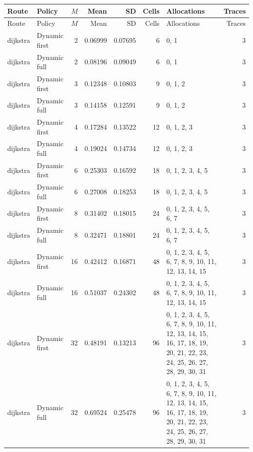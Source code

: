 \documentclass[10pt,a4paper]{article}
\begin{document}
\tiny\setlength{\tabcolsep}{2pt}\begin{longtable}{@{}p{23mm}p{29mm}rrrrp{36mm}r@{}}
\toprule Route & Policy & $M$ & Mean & SD & Cells & Allocations & Traces \\ \midrule\endfirsthead
\toprule Route & Policy & $M$ & Mean & SD & Cells & Allocations & Traces \\ \midrule\endhead
\bottomrule\endfoot
dijkstra & Dynamic first & 2 & 0.06999 & 0.07695 & 6 & 0, 1 & 3 \\
dijkstra & Dynamic full & 2 & 0.08196 & 0.09049 & 6 & 0, 1 & 3 \\
dijkstra & Dynamic first & 3 & 0.12348 & 0.10803 & 9 & 0, 1, 2 & 3 \\
dijkstra & Dynamic full & 3 & 0.14158 & 0.12591 & 9 & 0, 1, 2 & 3 \\
dijkstra & Dynamic first & 4 & 0.17284 & 0.13522 & 12 & 0, 1, 2, 3 & 3 \\
dijkstra & Dynamic full & 4 & 0.19024 & 0.14734 & 12 & 0, 1, 2, 3 & 3 \\
dijkstra & Dynamic first & 6 & 0.25303 & 0.16592 & 18 & 0, 1, 2, 3, 4, 5 & 3 \\
dijkstra & Dynamic full & 6 & 0.27008 & 0.18253 & 18 & 0, 1, 2, 3, 4, 5 & 3 \\
dijkstra & Dynamic first & 8 & 0.31402 & 0.18015 & 24 & 0, 1, 2, 3, 4, 5, 6, 7 & 3 \\
dijkstra & Dynamic full & 8 & 0.32471 & 0.18801 & 24 & 0, 1, 2, 3, 4, 5, 6, 7 & 3 \\
dijkstra & Dynamic first & 16 & 0.42412 & 0.16871 & 48 & 0, 1, 2, 3, 4, 5, 6, 7, 8, 9, 10, 11, 12, 13, 14, 15 & 3 \\
dijkstra & Dynamic full & 16 & 0.51037 & 0.24302 & 48 & 0, 1, 2, 3, 4, 5, 6, 7, 8, 9, 10, 11, 12, 13, 14, 15 & 3 \\
dijkstra & Dynamic first & 32 & 0.48191 & 0.13213 & 96 & 0, 1, 2, 3, 4, 5, 6, 7, 8, 9, 10, 11, 12, 13, 14, 15, 16, 17, 18, 19, 20, 21, 22, 23, 24, 25, 26, 27, 28, 29, 30, 31 & 3 \\
dijkstra & Dynamic full & 32 & 0.69524 & 0.25478 & 96 & 0, 1, 2, 3, 4, 5, 6, 7, 8, 9, 10, 11, 12, 13, 14, 15, 16, 17, 18, 19, 20, 21, 22, 23, 24, 25, 26, 27, 28, 29, 30, 31 & 3 \\
\end{longtable}\normalsize\setlength{\tabcolsep}{6pt}
\clearpage
\end{document}

